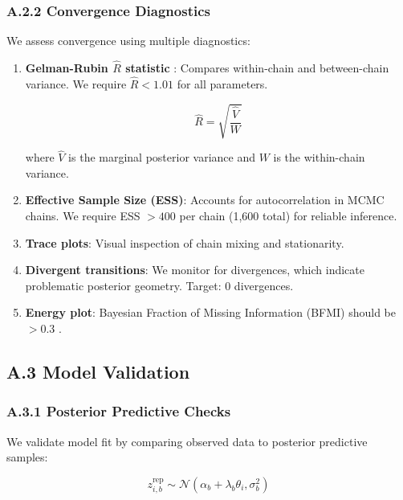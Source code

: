 \subsubsection*{A.2.2 Convergence Diagnostics}

We assess convergence using multiple diagnostics:

\begin{enumerate}
    \item \textbf{Gelman-Rubin $\hat{R}$ statistic} \cite{gelman1992inference}: Compares within-chain and between-chain variance. We require $\hat{R} < 1.01$ for all parameters.
    
    \begin{equation}
    \hat{R} = \sqrt{\frac{\hat{V}}{W}}
    \end{equation}
    
    where $\hat{V}$ is the marginal posterior variance and $W$ is the within-chain variance.
    
    \item \textbf{Effective Sample Size (ESS)}: Accounts for autocorrelation in MCMC chains. We require ESS $> 400$ per chain (1,600 total) for reliable inference.
    
    \item \textbf{Trace plots}: Visual inspection of chain mixing and stationarity.
    
    \item \textbf{Divergent transitions}: We monitor for divergences, which indicate problematic posterior geometry. Target: 0 divergences.
    
    \item \textbf{Energy plot}: Bayesian Fraction of Missing Information (BFMI) should be $> 0.3$ \cite{betancourt2016diagnosing}.
\end{enumerate}

\subsection*{A.3 Model Validation}

\subsubsection*{A.3.1 Posterior Predictive Checks}

We validate model fit by comparing observed data to posterior predictive samples:

\begin{equation}
z_{i,b}^{\text{rep}} \sim \mathcal{N}(\alpha_b + \lambda_b \theta_i, \sigma_b^2)
\end{equation}

